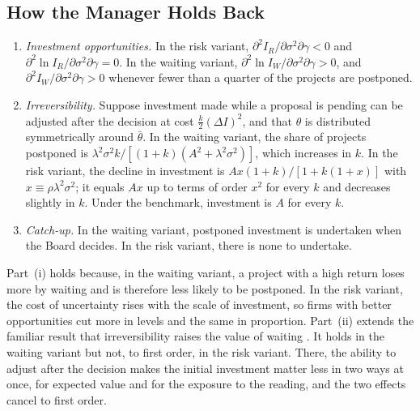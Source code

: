 \subsection{How the Manager Holds Back}\label{sec:model:holdback}

\begin{proposition}\label{prop:model:holdback}
\leavevmode
\begin{enumerate}[label=(\roman*)]
  \item \emph{Investment opportunities.} In the risk variant, $\partial^{2}I_R/\partial\sigma^{2}\partial\gamma<0$ and $\partial^{2}\ln I_R/\partial\sigma^{2}\partial\gamma=0$. In the waiting variant, $\partial^{2}\ln I_W/\partial\sigma^{2}\partial\gamma>0$, and $\partial^{2}I_W/\partial\sigma^{2}\partial\gamma>0$ whenever fewer than a quarter of the projects are postponed.
  \item \emph{Irreversibility.} Suppose investment made while a proposal is pending can be adjusted after the decision at cost $\tfrac{k}{2}(\Delta I)^{2}$, and that $\theta$ is distributed symmetrically around $\bar\theta$. In the waiting variant, the share of projects postponed is $\lambda^{2}\sigma^{2}k/[(1+k)(A^{2}+\lambda^{2}\sigma^{2})]$, which increases in $k$. In the risk variant, the decline in investment is $Ax(1+k)/[1+k(1+x)]$ with $x\equiv\rho\lambda^{2}\sigma^{2}$; it equals $Ax$ up to terms of order $x^{2}$ for every $k$ and decreases slightly in $k$. Under the benchmark, investment is $A$ for every $k$.
  \item \emph{Catch-up.} In the waiting variant, postponed investment is undertaken when the Board decides. In the risk variant, there is none to undertake.
\end{enumerate}
\end{proposition}

Part~(i) holds because, in the waiting variant, a project with a high return loses more by waiting and is therefore less likely to be postponed. In the risk variant, the cost of uncertainty rises with the scale of investment, so firms with better opportunities cut more in levels and the same in proportion. Part~(ii) extends the familiar result that irreversibility raises the value of waiting \citep{dixit1994investment}. It holds in the waiting variant but not, to first order, in the risk variant. There, the ability to adjust after the decision makes the initial investment matter less in two ways at once, for expected value and for the exposure to the reading, and the two effects cancel to first order.

